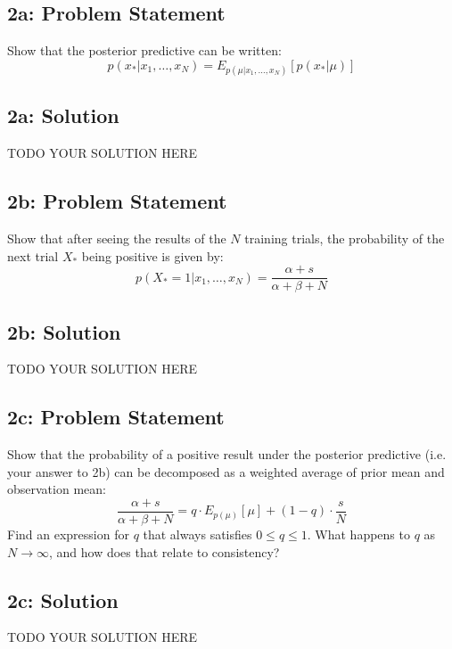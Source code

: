 \documentclass[10pt]{article}
\newcommand{\officialdirections}[1]{{\color{purple} #1}}
\begin{document}
\officialdirections{\subsection*{2a: Problem Statement}
Show that the posterior predictive can be written:
\begin{equation*}
p(x_*|x_1,\ldots,x_N) = E_{p(\mu|x_1,\ldots,x_N)}[p(x_*|\mu)]
\end{equation*}
}

\subsection{2a: Solution}
TODO YOUR SOLUTION HERE



\newpage
\officialdirections{\subsection*{2b: Problem Statement}
Show that after seeing the results of the $N$ training trials, the probability of the next trial $X_*$ being positive is given by:
\begin{equation*}
p(X_* = 1|x_1,\ldots,x_N) = \frac{\alpha + s}{\alpha + \beta + N}
\end{equation*}
}

\subsection{2b: Solution}
TODO YOUR SOLUTION HERE

\newpage
\officialdirections{\subsection*{2c: Problem Statement}
Show that the probability of a positive result under the posterior predictive (i.e. your answer to 2b) can be decomposed as a weighted average of prior mean and observation mean:
\begin{equation*}
\frac{\alpha + s}{\alpha + \beta + N} = q \cdot E_{p(\mu)}[\mu] + (1-q) \cdot \frac{s}{N}
\end{equation*}
Find an expression for $q$ that always satisfies $0 \leq q \leq 1$. What happens to $q$ as $N \to \infty$, and how does that relate to consistency?
}

\subsection{2c: Solution}
TODO YOUR SOLUTION HERE
\end{document}
